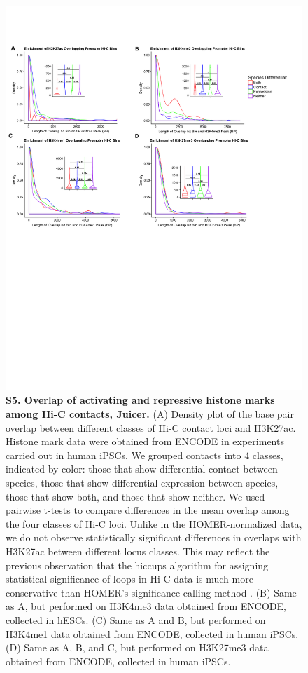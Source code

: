 \begin{figure}[!htb]
\centering
\includegraphics[width=6in]{img/figS5.pdf}
\caption[Overlap of activating and repressive histone marks among Hi-C contacts, Juicer.]{\textbf{S5. Overlap of activating and repressive histone marks among Hi-C contacts, Juicer.} (A) Density plot of the base pair overlap between different classes of Hi-C contact loci and H3K27ac. Histone mark data were obtained from ENCODE in experiments carried out in human iPSCs. We grouped contacts into 4 classes, indicated by color: those that show differential contact between species, those that show differential expression between species, those that show both, and those that show neither. We used pairwise t-tests to compare differences in the mean overlap among the four classes of Hi-C loci. Unlike in the HOMER-normalized data, we do not observe statistically significant differences in overlaps with H3K27ac between different locus classes. This may reflect the previous observation that the hiccups algorithm for assigning statistical significance of loops in Hi-C data is much more conservative than HOMER's significance calling method \cite{Forcato.2017}. (B) Same as A, but performed on H3K4me3 data obtained from ENCODE, collected in hESCs. (C) Same as A and B, but performed on H3K4me1 data obtained from ENCODE, collected in human iPSCs. (D) Same as A, B, and C, but performed on H3K27me3 data obtained from ENCODE, collected in human iPSCs.}
\label{fig:figS5}
\end{figure}


